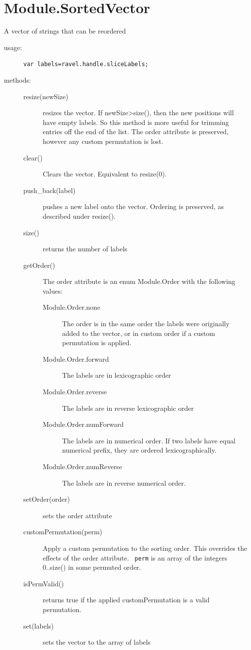 \documentclass{article}
\begin{document}
\section{Module.SortedVector}

A vector of strings that can be reordered

\begin{description}
\item[usage:] \verb+var labels=ravel.handle.sliceLabels;+

\item[methods:]\mbox{}
\begin{description}
\item[resize(newSize)] resizes the vector. If newSize>size(), then the
new positions will have empty labels. So this method is more useful
for trimming entries off the end of the list. The order attribute is
preserved, however any custom permutation is lost.
\item[clear()] Clears the vector. Equivalent to resize(0).
\item[push\_back(label)] pushes a new label onto the vector. Ordering
is preserved, as described under resize().
\item[size()] returns the number of labels

\item[getOrder()] The order attribute is an enum Module.Order with the
following values:
\begin{description}
\item[Module.Order.none] The order is in the same order the labels
were originally added to the vector, or in custom order if a custom
permutation is applied.
\item[Module.Order.forward] The labels are in lexicographic order
\item[Module.Order.reverse] The labels are in reverse lexicographic order
\item[Module.Order.numForward] The labels are in numerical order. If two labels
have equal numerical prefix, they are ordered lexicographically.
\item[Module.Order.numReverse] The labels are in reverse numerical
order.
\end{description}
\item[setOrder(order)] sets the order attribute

\item[customPermutation(perm)] Apply a custom permutation to the
sorting order. This overrides the effects of the order attribute. {\tt
perm} is an array of the integers 0..size() in some permuted order.
\item[isPermValid()] returns true if the applied customPermutation is
a valid permutation.
\item[set(labels)] sets the vector to the array of labels
\end{description} 
\end{description} 
\end{document}
